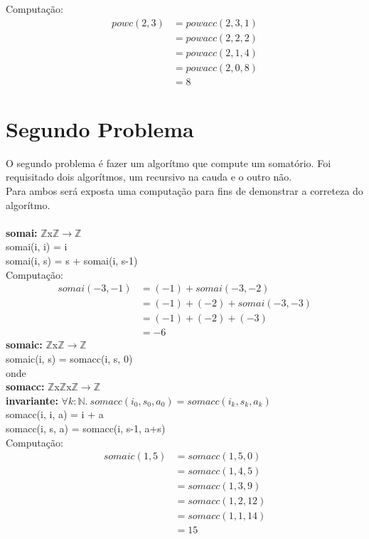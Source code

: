 \documentclass{article}
\begin{document}
Computação:\\
\begin{align*}
powc(2, 3) &= powacc(2, 3, 1)\\
&= powacc(2, 2, 2)\\
&= powacc(2, 1, 4)\\
&= powacc(2, 0, 8)\\
&= 8
\end{align*}

\section{Segundo Problema}
O segundo problema é fazer um algorítmo que compute um somatório.
Foi requisitado dois algorítmos, um recursivo na cauda e o outro não.\\
Para ambos será exposta uma computação para fins de demonstrar a correteza do algorítmo.\\
\\
\noindent \textbf{somai:} $\mathbb{Z}$x$\mathbb{Z}$$ \rightarrow \mathbb{Z}$\\
somai(i, i) = i\\
somai(i, s) = s + somai(i, s-1)\\
Computação:
\begin{align*}
somai(-3, -1) &= (-1) + somai(-3, -2)\\
&= (-1) + (-2) + somai(-3, -3)\\
&= (-1) + (-2) + (-3)\\
&= -6
\end{align*}
\noindent \textbf{somaic:} $\mathbb{Z}$x$\mathbb{Z}$$ \rightarrow \mathbb{Z}$\\
somaic(i, s) = somacc(i, s, 0)\\
onde\\
\indent \textbf{somacc:} $\mathbb{Z}$x$\mathbb{Z}$x$\mathbb{Z}$$ \rightarrow \mathbb{Z}$\\
\indent \textbf{invariante:} $\forall k:\mathbb{N}.\: somacc(i_0, s_0, a_0) = somacc(i_k, s_k, a_k)$\\
\indent somacc(i, i, a) = i + a\\
\indent somacc(i, s, a) = somacc(i, s-1, a+s)\\
Computação:
\begin{align*}
somaic(1, 5) &= somacc(1, 5, 0)\\
&= somacc(1, 4, 5)\\
&= somacc(1, 3, 9)\\
&= somacc(1, 2, 12)\\
&= somacc(1, 1, 14)\\
&= 15
\end{align*}
\end{document}
